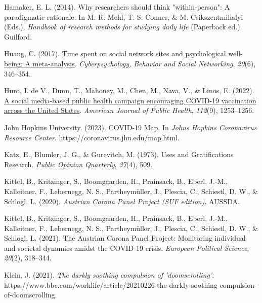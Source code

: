 \documentclass[
  man,mask,floatsintext]{apa7}
\newlength{\cslhangindent}
\newlength{\cslentryspacingunit} %
\newenvironment{CSLReferences}[2] %
 {%
  \setlength{\parindent}{0pt}
  \ifodd #1
  \let\oldpar\par
  \def\par{\hangindent=\cslhangindent\oldpar}
  \fi
  \setlength{\parskip}{#2\cslentryspacingunit}
 }%
 {}
\begin{document}
\begin{CSLReferences}{1}{0}
\leavevmode{}%
Hamaker, E. L. (2014). Why researchers should think "within-person": {A} paradigmatic rationale. In M. R. Mehl, T. S. Conner, \& M. Csikszentmihalyi (Eds.), \emph{Handbook of research methods for studying daily life} (Paperback ed.). {Guilford}.

\leavevmode{}%
Huang, C. (2017). \href{https://www.ncbi.nlm.nih.gov/pubmed/28622031}{Time spent on social network sites and psychological well-being: {A} meta-analysis}. \emph{Cyberpsychology, Behavior and Social Networking}, \emph{20}(6), 346--354.

\leavevmode{}%
Hunt, I. de V., Dunn, T., Mahoney, M., Chen, M., Nava, V., \& Linos, E. (2022). \href{https://www.ncbi.nlm.nih.gov/pmc/articles/PMC9382165}{A social media-based public health campaign encouraging {COVID-19} vaccination across the {United States}}. \emph{American Journal of Public Health}, \emph{112}(9), 1253--1256.

\leavevmode{}%
John Hopkins University. (2023). {COVID-19 Map}. In \emph{Johns Hopkins Coronavirus Resource Center}. https://coronavirus.jhu.edu/map.html.

\leavevmode{}%
Katz, E., Blumler, J. G., \& Gurevitch, M. (1973). Uses and {Gratifications Research}. \emph{Public Opinion Quarterly}, \emph{37}(4), 509.

\leavevmode{}%
Kittel, B., Kritzinger, S., Boomgaarden, H., Prainsack, B., Eberl, J.-M., Kalleitner, F., Lebernegg, N. S., Partheymüller, J., Plescia, C., Schiestl, D. W., \& Schlogl, L. (2020). \emph{Austrian {Corona Panel Project} ({SUF} edition)}. {AUSSDA}.

\leavevmode{}%
Kittel, B., Kritzinger, S., Boomgaarden, H., Prainsack, B., Eberl, J.-M., Kalleitner, F., Lebernegg, N. S., Partheymüller, J., Plescia, C., Schiestl, D. W., \& Schlogl, L. (2021). The {Austrian Corona Panel Project}: Monitoring individual and societal dynamics amidst the {COVID-19} crisis. \emph{European Political Science}, \emph{20}(2), 318--344.

\leavevmode{}%
Klein, J. (2021). \emph{The darkly soothing compulsion of 'doomscrolling'}. https://www.bbc.com/worklife/article/20210226-the-darkly-soothing-compulsion-of-doomscrolling.


\end{CSLReferences}
\end{document}
